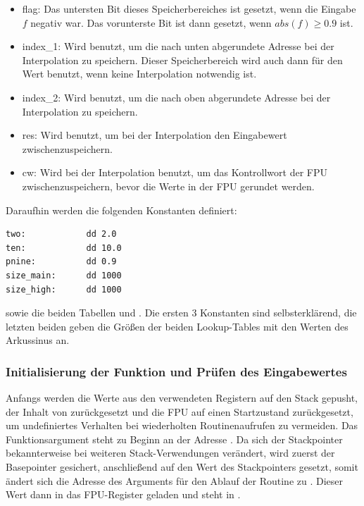 \documentclass{article}
\begin{document}
	\begin{itemize}
	\item flag: Das untersten Bit dieses Speicherbereiches ist gesetzt,
	wenn die Eingabe \(f\) negativ war. Das vorunterste Bit ist dann
	gesetzt, wenn \(abs(f)\geq 0.9\) ist.
	\item index\_1: Wird benutzt, um die nach unten abgerundete
	Adresse bei der Interpolation zu speichern. Dieser Speicherbereich
	wird auch dann für den Wert benutzt, wenn keine Interpolation
	notwendig ist.
	\item index\_2: Wird benutzt, um die nach oben abgerundete
	Adresse bei der Interpolation zu speichern.
	\item res: Wird benutzt, um bei der Interpolation den Eingabewert
	zwischenzuspeichern.
	\item cw: Wird bei der Interpolation benutzt, um das Kontrollwort der
	FPU zwischenzuspeichern, bevor die Werte in der FPU gerundet werden.
	\end{itemize}

	Daraufhin werden die folgenden Konstanten definiert:

\vspace{0.5cm}

\begin{lstlisting}
two:            dd 2.0
ten:            dd 10.0
pnine:          dd 0.9
size_main:      dd 1000
size_high:      dd 1000
\end{lstlisting}

\vspace{0.5cm}

	sowie die beiden Tabellen  und .
	Die ersten 3 Konstanten sind selbsterklärend, die letzten beiden geben
	die Größen der beiden Lookup-Tables mit den Werten des Arkussinus an.

\subsubsection{Initialisierung der Funktion und Prüfen des Eingabewertes}

	Anfangs werden die Werte aus den verwendeten Registern auf
	den Stack gepusht, der Inhalt von  zurückgesetzt 
	und die FPU auf einen Startzustand zurückgesetzt, 
	um undefiniertes Verhalten bei wiederholten Routinenaufrufen zu vermeiden.
	Das Funktionsargument steht zu Beginn an der Adresse .
	Da sich der Stackpointer bekannterweise bei weiteren Stack-Verwendungen verändert,
	wird zuerst der Basepointer gesichert, anschließend auf den Wert des Stackpointers gesetzt,
	somit ändert sich die Adresse des Arguments für den Ablauf der Routine zu .
	Dieser Wert dann in das FPU-Register geladen und steht in .
\end{document}
